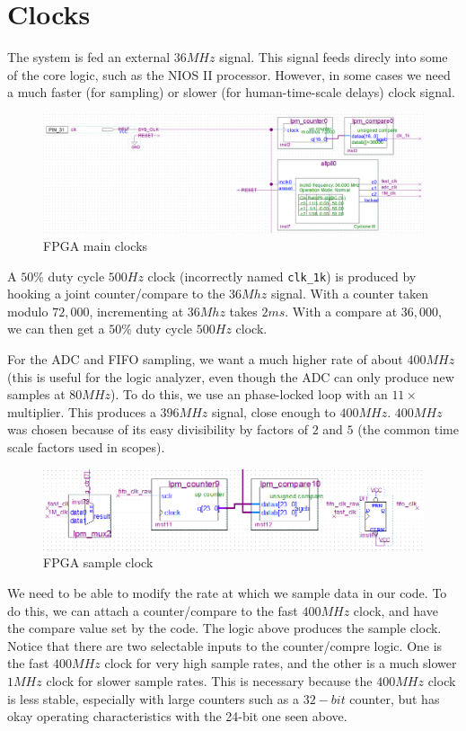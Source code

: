 \section{Clocks}

The system is fed an external $36MHz$ signal. This signal feeds direcly into some of the core logic, such as the NIOS II processor. However, in some cases we need a much faster (for sampling) or slower (for human-time-scale delays) clock signal.

\begin{figure}[ht!]
    \centering
    \includegraphics[width=6in]{fpga_logic/clocks.png}
		\caption{FPGA main clocks}
\end{figure}

A $50\%$ duty cycle $500Hz$ clock (incorrectly named \verb=clk_1k=) is produced by hooking a joint counter/compare to the $36Mhz$ signal. With a counter taken modulo $72,000$, incrementing at $36Mhz$ takes $2ms$. With a compare at $36,000$, we can then get a $50\%$ duty cycle $500Hz$ clock.

For the ADC and FIFO sampling, we want a much higher rate of about $400MHz$ (this is useful for the logic analyzer, even though the ADC can only produce new samples at $80MHz$). To do this, we use an phase-locked loop with an $11\times$ multiplier. This produces a $396MHz$ signal, close enough to $400MHz$. $400MHz$ was chosen because of its easy divisibility by factors of $2$ and $5$ (the common time scale factors used in scopes).

\begin{figure}[ht!]
    \centering
    \includegraphics[width=6in]{fpga_logic/adc_sample_clk.png}
		\caption{FPGA sample clock}
\end{figure}

We need to be able to modify the rate at which we sample data in our code. To do this, we can attach a counter/compare to the fast $400MHz$ clock, and have the compare value set by the code. The logic above produces the sample clock. Notice that there are two selectable inputs to the counter/compre logic. One is the fast $400MHz$ clock for very high sample rates, and the other is a much slower $1MHz$ clock for slower sample rates. This is necessary because the $400MHz$ clock is less stable, especially with large counters such as a $32-bit$ counter, but has okay operating characteristics with the 24-bit one seen above.


